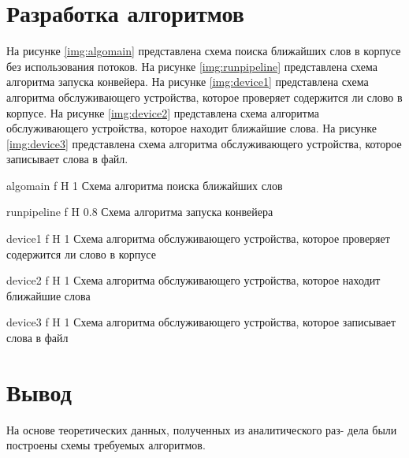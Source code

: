 \section{Разработка алгоритмов}

На рисунке \ref{img:algomain} представлена схема поиска ближайших слов в корпусе без использования потоков. 
На рисунке \ref{img:runpipeline} представлена схема алгоритма запуска конвейера. 
На рисунке \ref{img:device1} представлена схема алгоритма обслуживающего устройства, которое проверяет содержится ли слово в корпусе. 
На рисунке \ref{img:device2} представлена схема алгоритма обслуживающего устройства, которое находит ближайшие слова. 
На рисунке \ref{img:device3} представлена схема алгоритма обслуживающего устройства, которое записывает слова в файл. 


{algomain} %
{f} %
{H} %
{1\textwidth} %
{Схема алгоритма поиска ближайших слов} %


{runpipeline} %
{f} %
{H} %
{0.8\textwidth} %
{Схема алгоритма запуска конвейера} %


{device1} %
{f} %
{H} %
{1\textwidth} %
{Схема алгоритма обслуживающего устройства, которое проверяет содержится ли слово в корпусе} %

{device2} %
{f} %
{H} %
{1\textwidth} %
{Схема алгоритма обслуживающего устройства, которое находит ближайшие слова} %

{device3} %
{f} %
{H} %
{1\textwidth} %
{Схема алгоритма обслуживающего устройства, которое записывает слова в файл} %


\section*{Вывод}
На основе теоретических данных, полученных из аналитического раз-
дела были построены схемы требуемых алгоритмов. 